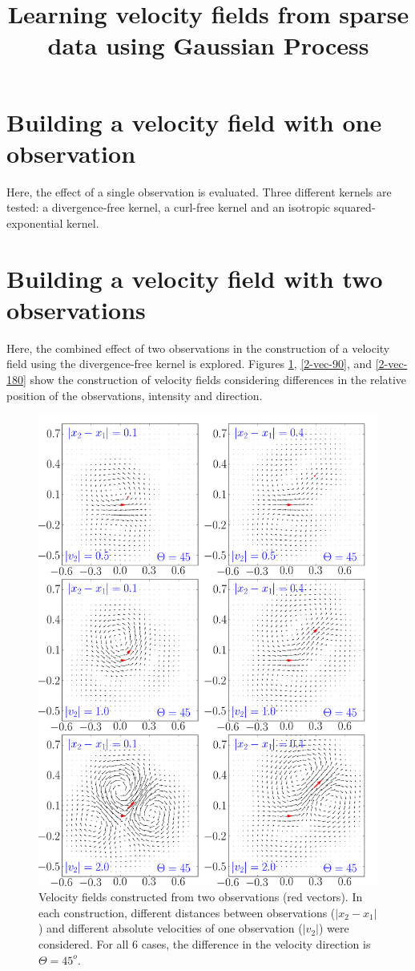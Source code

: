 \documentclass[12pt,a4paper]{article}%
\title{Learning velocity fields from sparse data using Gaussian Process}
\author{}
\begin{document}
\section{Building a velocity field with one observation}
Here, the effect of a single observation is evaluated. Three different kernels are tested: 
a divergence-free kernel, a curl-free kernel and an isotropic squared-exponential kernel. 
\newpage
\section{Building a velocity field with two observations}
Here, the combined effect of two observations in the construction of a velocity field using 
the divergence-free kernel is explored. Figures \ref{2-vec-45}, \ref{2-vec-90}, and \ref{2-vec-180} 
show the construction of velocity fields considering differences in the relative position of 
the observations, intensity and direction.
\begin{figure}
\centering\includegraphics[width=36pc]{plots/2_vectors_angle_45.png}
\caption{Velocity fields constructed from two observations (red vectors). 
In each construction,  different distances between observations ($|x_2 - x_1|$) 
and different absolute velocities of one observation ($|v_2|$) were considered. 
For all 6 cases, the difference in the velocity direction is $\Theta=45^o$. }
\label{2-vec-45}
\end{figure}
\end{document}
